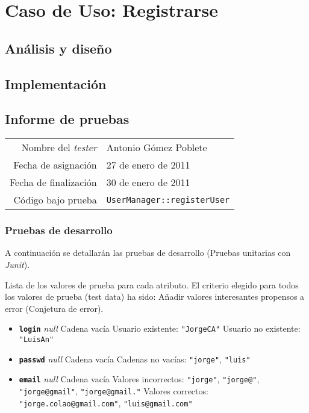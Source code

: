 \section{Caso de Uso: Registrarse}

\subsection{Análisis y diseño}

\subsection{Implementación}

\subsection{Informe de pruebas}

{\small
\begin{tabular}{r|l}
Nombre del \textit{tester} & Antonio Gómez Poblete \\
Fecha de asignación & 27 de enero de 2011 \\
Fecha de finalización & 30 de enero de 2011 \\
Código bajo prueba & \texttt{UserManager::registerUser}
\end{tabular}
}

\subsubsection{Pruebas de desarrollo}

A continuación se detallarán las pruebas de desarrollo (Pruebas unitarias con \textit{Junit}).

Lista de los valores de prueba para cada atributo.
El criterio elegido para todos los valores de prueba (test data) ha sido: Añadir valores interesantes propensos a error (Conjetura de error).

\begin{itemize}
\item \textbf{\texttt{login}}
\subitem \textit{null}
\subitem Cadena vacía
\subitem Usuario existente: \texttt{"JorgeCA"}
\subitem Usuario no existente: \texttt{"LuisAn"}

\item \textbf{\texttt{passwd}}
\subitem \textit{null}
\subitem Cadena vacía
\subitem Cadenas no vacías: \texttt{"jorge"}, \texttt{"luis"}

\item \textbf{\texttt{email}}
\subitem \textit{null}
\subitem Cadena vacía
\subitem Valores incorrectos: \texttt{"jorge"}, \texttt{"jorge@"}, \texttt{"jorge@gmail"}, \texttt{"jorge@gmail."}
\subitem Valores correctos: \texttt{"jorge.colao@gmail.com"}, \texttt{"luis@gmail.com"}
\end{itemize}

